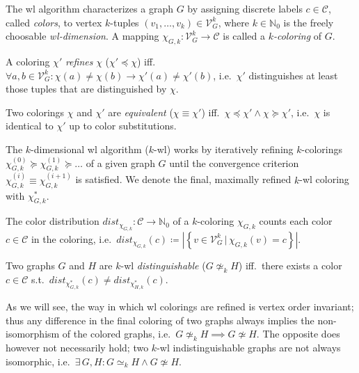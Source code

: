 The \acf{wl} algorithm characterizes a graph $G$ by assigning discrete labels $c \in \mathcal{C}$, called \textit{colors}, to vertex $k$-tuples $(v_1, \dots, v_k) \in \mathcal{V}_G^k$, where $k \in \mathbb{N}_0$ is the freely choosable \textit{\ac{wl}-dimension}.
A mapping $\chi_{G, k}: \mathcal{V}_G^k \to \mathcal{C}$ is called a \textit{$k$-coloring} of $G$.
\begin{defn}
    A coloring $\chi'$ \textit{refines} $\chi$ ($\chi' \preceq \chi$) iff.\ $\forall a, b \in \mathcal{V}_G^k: \chi(a) \neq \chi(b) \rightarrow \chi'(a) \neq \chi'(b)$, i.e.\ $\chi'$ distinguishes at least those tuples that are distinguished by $\chi$.
\end{defn}
\begin{defn}
    Two colorings $\chi$ and $\chi'$ are \textit{equivalent} ($\chi \equiv \chi'$) iff.\ $\chi \preceq \chi' \land \chi \succeq \chi'$, i.e.\ $\chi$ is identical to $\chi'$ up to color substitutions.
\end{defn}
The $k$-dimensional \ac{wl} algorithm ($k$-\acs{wl}) works by iteratively refining $k$-colorings $\chi_{G, k}^{(0)} \succeq \chi_{G, k}^{(1)} \succeq \dots$ of a given graph $G$ until the convergence criterion $\chi_{G, k}^{(i)} \equiv \chi_{G, k}^{(i+1)}$ is satisfied.
We denote the final, maximally refined $k$-\acs{wl} coloring with $\chi^{*}_{G, k}$.
\begin{defn}
    The color distribution $\mathit{dist}_{\chi_{G, k}}: \mathcal{C} \to \mathbb{N}_0$ of a $k$-coloring $\chi_{G, k}$ counts each color $c \in \mathcal{C}$ in the coloring, i.e.\ $\mathit{dist}_{\chi_{G, k}}(c) \coloneqq \left|\left\{ v \in \mathcal{V}_G^k\, |\, \chi_{G, k}(v) = c \right\}\right|$. %
\end{defn}
\begin{defn}\label{defn:related:wl-distinguishable}
    Two graphs $G$ and $H$ are $k$-\acs{wl} \textit{distinguishable} ($G \mathrel{{\not\simeq}_k} H$) iff.\ there exists a color $c \in \mathcal{C}$ s.t.\ $\mathit{dist}_{\chi^{*}_{G, k}}(c) \neq \mathit{dist}_{\chi^{*}_{H, k}}(c)$.
\end{defn}
As we will see, the way in which \ac{wl} colorings are refined is vertex order invariant;
thus any difference in the final coloring of two graphs always implies the non-isomorphism of the colored graphs, i.e.\ $G \mathrel{{\not\simeq}_k} H \implies G \not\simeq H$.
The opposite does however not necessarily hold;
two $k$-\acs{wl} indistinguishable graphs are not always isomorphic, i.e.\ $\exists\, G, H: G \mathrel{{\simeq}_k} H \land G \not\simeq H$. %

